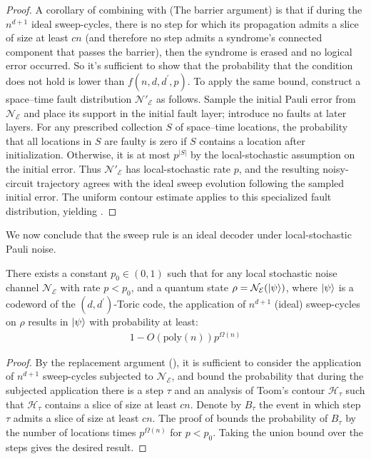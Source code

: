\begin{proof} 
A corollary of combining  with  (The barrier argument) is that if during the $n^{d+1}$ ideal sweep-cycles, there is no step for which its propagation admits a slice of size at least $cn$ (and therefore no step admits a syndrome's connected component that passes the barrier), then the syndrome is erased and no logical error occurred. So it's sufficient to show that the probability that the condition does not hold is lower than $f(n,d,d^{\prime},p)$. To apply the same bound, construct a space--time fault distribution
$\mathcal N'_{\mathcal E}$ as follows. Sample the initial Pauli error from
$\mathcal N_{\mathcal E}$ and place its support in the initial fault layer;
introduce no faults at later layers. For any prescribed collection $S$ of
space--time locations, the probability that all locations in $S$ are faulty
is zero if $S$ contains a location after initialization. Otherwise, it is at
most $p^{|S|}$ by the local-stochastic assumption on the initial error.
Thus $\mathcal N'_{\mathcal E}$ has local-stochastic rate $p$, and the resulting
noisy-circuit trajectory agrees with the ideal sweep evolution following the
sampled initial error. The uniform contour estimate applies to this specialized
fault distribution, yielding .
\end{proof}
We now conclude that the sweep rule is an ideal decoder under local-stochastic Pauli noise.
  \begin{theorem}
    \label{theorem:idealdec}
There exists a constant $p_{0} \in (0,1)$ such that for any local stochastic noise channel $\mathcal{N}_{\mathcal{E}}$ with rate $p < p_{0}$, and a quantum state $\rho = \mathcal{N}_{\mathcal{E}}(\ket{\psi})$, where $\ket{\psi}$ is a codeword of the $(d,d^{\prime})$-Toric code, the application of $n^{d+1}$ (ideal) sweep-cycles on $\rho$ results in $\ket{\psi}$ with probability at least:
\begin{equation*}
  \begin{split}
    1 -   O \left( \text{poly}(n) \right)  p^{\Omega(n)} 
  \end{split}
\end{equation*}
  \end{theorem} 
  \begin{proof}
    By the replacement argument (), it is sufficient to consider the application of $n^{d+1}$ sweep-cycles subjected to $\mathcal{N}_{\mathcal{E}}$, and bound the probability that during the subjected application there is a step $\tau$ and an analysis of Toom's contour $\mathcal{H}_{\tau}$ such that $\mathcal{H}_{\tau}$ contains a slice of size at least $cn$. Denote by $B_{\tau}$ the event in which step $\tau$ admits a slice of size at least $cn$. The proof of  bounds the probability of $B_{\tau}$ by the number of locations times $p^{\Omega(n)}$ for $p < p_{0}$. Taking the union bound over the steps gives the desired result.
  \end{proof}






